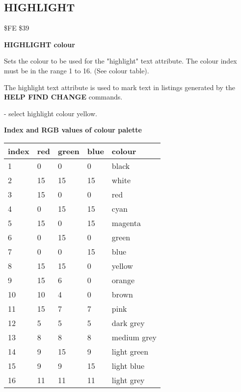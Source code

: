 
\newpage
\subsection{HIGHLIGHT}
\begin{description}[leftmargin=3cm,style=nextline]
\item [Token:] \$FE \$39
\item [Format:] {\bf HIGHLIGHT colour}
\item [Usage:] Sets the colour
               to be used for the "highlight" text attribute.
               The colour index must be in the
               range 1 to 16. (See colour table).
\item [Remarks:] The highlight text attribute is used to mark text
               in listings generated by the {\bf HELP FIND CHANGE}
               commands.
\item [Example:]  - select highlight colour yellow.
\item [Colours:] {\bf Index and RGB values of colour palette}

\ttfamily
{\setlength{\tabcolsep}{1mm}
\begin{tabular}{*{4}{|R{1.2cm}}|l|}
\hline
 index  &   red & green & blue & colour \\
 &    0  &   0   &  0   & black \\
  2 &   15  &  15   & 15   & white \\
  3 &   15  &   0   &  0   & red   \\
  4 &    0  &  15   & 15   & cyan  \\
  5 &   15  &   0   & 15   & magenta\\
  6 &    0  &  15   &  0   & green \\
  7 &    0  &   0   & 15   & blue  \\
  8 &   15  &  15   &  0   & yellow\\
  9 &   15  &   6   &  0   & orange\\
 10 &   10  &   4   &  0   & brown \\
 11 &   15  &   7   &  7   & pink  \\
 12 &    5  &   5   &  5   & dark grey\\
 13 &    8  &   8   &  8   & medium grey\\
 14 &    9  &  15   &  9   & light green \\
 15 &    9  &   9   & 15   & light blue\\
 16 &   11  &  11   & 11   & light grey\\
\hline
\end{tabular}
}
\end{description}

